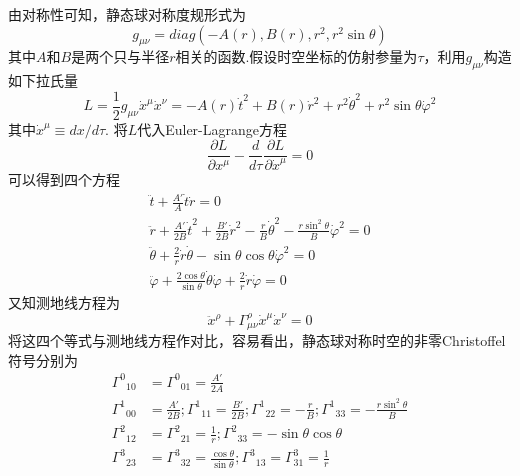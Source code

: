         由对称性可知，静态球对称度规形式为
        \begin{equation}
            g_{\mu\nu}=diag\left(-A(r),B(r),r^2,r^2\sin\theta\right)
        \end{equation}
        其中$A$和$B$是两个只与半径$r$相关的函数.假设时空坐标的仿射参量为$\tau$，利用$g_{\mu\nu}$构造如下拉氏量
        \begin{equation}
            L=\frac{1}{2}g_{\mu\nu}\dot{x}^\mu\dot{x}^\nu=-A(r)\dot{t}^2+B(r)\dot{r}^2+r^2\dot{\theta}^2+r^2\sin\theta\dot{\varphi}^2
        \end{equation}
        其中$\dot{x}^\mu\equiv dx/d\tau$.
        将$L$代入Euler-Lagrange方程
        \begin{equation}
            \frac{\partial L}{\partial x^\mu}-\frac{d}{d\tau}\frac{\partial L}{\partial \dot{x}^\mu}=0
        \end{equation}
        可以得到四个方程
        \begin{eqnarray*}
            \ddot{t}+\frac{A'}{A}\dot{t}\dot{r}=0\\
            \ddot{r}+\frac{A'}{2B}\dot{t}^2+\frac{B'}{2B}\dot{r}^2-\frac{r}{B}\dot{\theta}^2-\frac{r\sin^2\theta}{B}\dot{\varphi}^2=0\\
            \ddot{\theta}+\frac{2}{r}\dot{r}\dot{\theta}-\sin\theta \cos\theta\dot{\varphi}^2=0\\
            \ddot{\varphi}+\frac{2\cos\theta}{\sin\theta}\dot{\theta}\dot{\varphi}+\frac{2}{r}\dot{r}\dot{\varphi}=0
        \end{eqnarray*}
        又知测地线方程为
        \begin{equation}
            \ddot{x}^\rho+\varGamma^\rho_{\mu\nu}\dot{x}^\mu\dot{x}^\nu=0
        \end{equation}
        将这四个等式与测地线方程作对比，容易看出，静态球对称时空的非零Christoffel符号分别为
        \begin{equation}
            \begin{split}
                    {\varGamma^0}_{10}&={\varGamma^0}_{01}=\frac{A'}{2A}\\
                    {\varGamma^1}_{00}&=\frac{A'}{2B};{\varGamma^1}_{11}=\frac{B'}{2B};{\varGamma^1}_{22}=-\frac{r}{B};{\varGamma^1}_{33}=-\frac{r\sin^2\theta}{B}\\
                    {\varGamma^2}_{12}&={\varGamma^2}_{21}=\frac{1}{r};{\varGamma^2}_{33}=-\sin\theta \cos\theta\\
                    {\varGamma^3}_{23}&={\varGamma^3}_{32}=\frac{\cos\theta}{\sin\theta};{\varGamma^3}_{13}=\varGamma^3_{31}=\frac{1}{r}
            \end{split}
        \end{equation}
        
